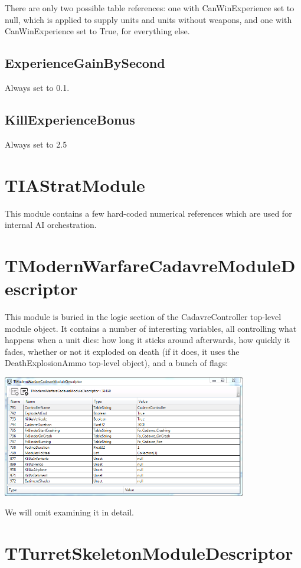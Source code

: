 \documentclass{article}
\begin{document}
There are only two possible table references: one with CanWinExperience set to null, which is applied to supply units and units without weapons, and one with CanWinExperience set to True, for everything else.

\subsection{ExperienceGainBySecond}

Always set to 0.1.

\subsection{KillExperienceBonus}

Always set to 2.5

\section{TIAStratModule}

This module contains a few hard-coded numerical references which are used for internal AI orchestration.

\section{TModernWarfareCadavreModuleDescriptor}

This module is buried in the logic section of the CadavreController top-level module object. It contains a number of interesting variables, all controlling what happens when a unit dies: how long it sticks around afterwards, how quickly it fades, whether or not it exploded on death (if it does, it uses the DeathExplosionAmmo top-level object), and a bunch of flags:

\includegraphics[width=0.8\textwidth]{screenshot_cadavre}

We will omit examining it in detail.

\section{TTurretSkeletonModuleDescriptor}
\end{document}
